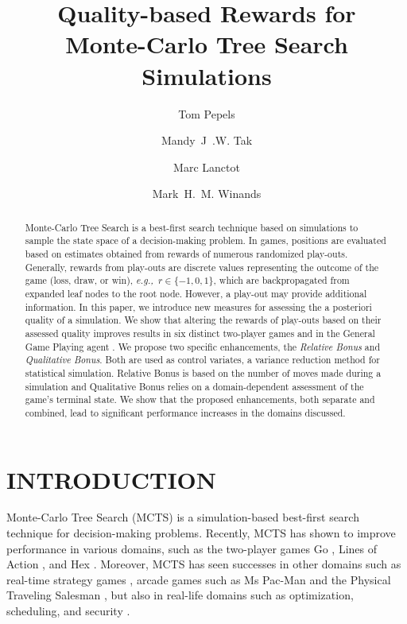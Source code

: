 \documentclass{ecai2014}
\newcommand{\eg}{{\it e.g.,}~}
\begin{document}
\title{Quality-based Rewards for \\ Monte-Carlo Tree Search Simulations}

\author{Tom Pepels \and Mandy~J~.W. Tak \and Marc Lanctot \and Mark~H.~M. Winands }

\maketitle


\begin{abstract}
Monte-Carlo Tree Search is a best-first search technique based on simulations to sample the state space of a decision-making problem. In games, positions are evaluated based on estimates obtained from rewards of numerous randomized play-outs. Generally, rewards from play-outs are discrete values representing the outcome of the game (loss, draw, or win), \eg $r \in \{-1, 0, 1\}$, which are backpropagated from expanded leaf nodes to the root node. However, a play-out may provide additional information. In this paper, we introduce new measures for assessing the a posteriori quality of a simulation. We show that altering the rewards of play-outs based on their assessed quality improves results in six distinct two-player games and in the General Game Playing agent {}. We propose two specific enhancements, the \emph{Relative Bonus} and \emph{Qualitative Bonus}. Both are used as control variates, a variance reduction method for statistical simulation. Relative Bonus is based on the number of moves made during a simulation and Qualitative Bonus relies on a domain-dependent assessment of the game's terminal state. We show that the proposed enhancements, both separate and combined, lead to significant performance increases in the domains discussed.
\end{abstract}

\section{INTRODUCTION}
\label{sec:intro}
Monte-Carlo Tree Search (MCTS) \cite{coulom2007efficient,kocsis2006bandit} is a simulation-based best-first search technique for decision-making problems. Recently, MCTS has shown to improve performance in various domains, such as the two-player games Go \cite{lee2010current}, Lines of Action \cite{Winands2010b}, and Hex \cite{arneson2010monte}. Moreover, MCTS has seen successes in other domains such as real-time strategy games \cite{browne2012survey}, arcade games such as Ms Pac-Man \cite{enhancementspacmancig12} and the Physical Traveling Salesman \cite{powleytsp}, but also in real-life domains such as optimization, scheduling, and security \cite{browne2012survey}.
\end{document}

